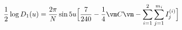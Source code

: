 \begin{equation}
\frac{1}{2}\log{D}_1(u)=
\frac{2\pi}{N}\sin 5u\Bigl[\frac{7}{240}
-\frac{1}{4}\vm C\vm-\sum_{i=1}^{2}\sum_{j=1}^{m_i}I^{(i)}_j
\Bigr]
\end{equation}

